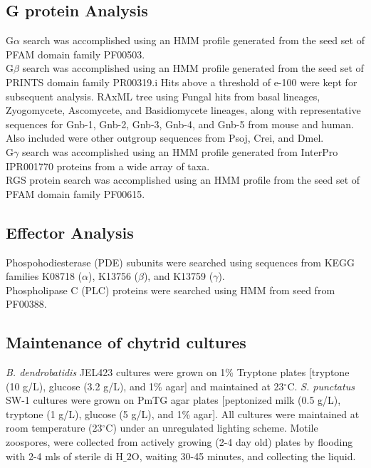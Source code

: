 \subsection*{G protein Analysis}
\indent G$\alpha$ search was accomplished using an HMM profile generated from the seed set of PFAM domain family PF00503.\\
\indent G$\beta$ search was accomplished using an HMM profile generated from the seed set of PRINTS domain family PR00319.i Hits above a threshold of e-100 were kept for subsequent analysis. RAxML tree using Fungal hits from basal lineages, Zyogomycete, Ascomycete, and Basidiomycete lineages, along with representative sequences for Gnb-1, Gnb-2, Gnb-3, Gnb-4, and Gnb-5 from mouse and human. Also included were other outgroup sequences from Psoj, Crei, and Dmel.\\
\indent G$\gamma$ search was accomplished using an HMM profile generated from InterPro IPR001770 proteins from a wide array of taxa.\\
\indent RGS protein search was accomplished using an HMM profile from the seed set of PFAM domain family PF00615.\\

\subsection*{Effector Analysis}
\indent Phospohodiesterase (PDE) subunits were searched using sequences from KEGG families K08718 ($\alpha$), K13756 ($\beta$), and K13759 ($\gamma$). \\
\indent Phospholipase C (PLC) proteins were searched using HMM from seed from PF00388.\\

\subsection*{Maintenance of chytrid cultures}
\textit{B. dendrobatidis} JEL423 cultures were grown on 1\% Tryptone plates [tryptone (10 g/L), glucose (3.2 g/L), and 1\% agar] and maintained at 23$^{\circ}$C. \textit{S. punctatus} SW-1 cultures were grown on PmTG agar plates [peptonized milk (0.5 g/L), tryptone (1 g/L), glucose (5 g/L), and 1\% agar]. All cultures were maintained at room temperature (23$^{\circ}$C) under an unregulated lighting scheme. Motile zoospores, were collected from actively growing (2-4 day old) plates by flooding with 2-4 mls of sterile di H$\_{2}$O, waiting 30-45 minutes, and collecting the liquid. \\

